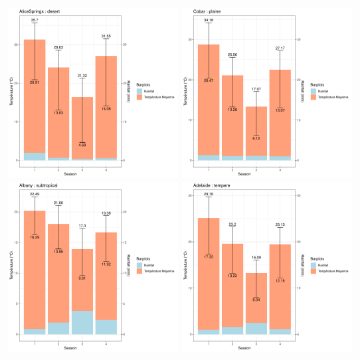 \documentclass{article}
\begin{document}
\begin{figure}[p]
    \centering
        \includegraphics[page=1,width=0.4\textwidth]{Images/temp_and_rainfall/Temp_and_Rainfalldesert.pdf}
        \includegraphics[page=1,width=0.4\textwidth]{Images/temp_and_rainfall/Temp_and_Rainfallplaine.pdf}
        \includegraphics[page=1,width=0.4\textwidth]{Images/temp_and_rainfall/Temp_and_Rainfallsubtropical.pdf}
        \includegraphics[page=1,width=0.4\textwidth]{Images/temp_and_rainfall/Temp_and_Rainfalltempere.pdf}

\end{figure}
\end{document}
